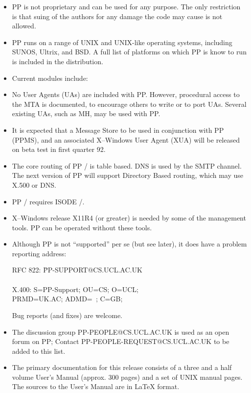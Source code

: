 
\begin{itemize}
\item PP is not proprietary and can be used for any purpose. The only
restriction is that suing of the authors for any damage
the code may cause is not allowed.

\item PP runs on a range of UNIX and UNIX-like operating systems, including
 SUNOS, Ultrix, and BSD.  A full list of platforms on which PP is know
 to run is included in the distribution.

\item Current modules include:



\item No User Agents (UAs) are included with PP.  However, procedural access
to the MTA is documented, to encourage others to write or to port UAs.
Several existing UAs, such as MH, may be used with PP. 


\item It is expected that a Message Store to be used in conjunction
  with PP (PPMS), and an associated X--Windows User Agent (XUA) will
  be released on beta test in first quarter 92.

\item The core routing of PP \ppversion/ is table based.   DNS is used
  by the SMTP channel.   The next version of PP will support Directory
  Based routing, which may use X.500 or DNS.   

\item PP \ppversion/ requires ISODE \isodevrsn/.

\item X--Windows release X11R4 (or greater) is needed by some of the
management tools.  PP  can be operated without these tools.

\item Although PP is not ``supported'' per se (but see later), it does
have a problem reporting address:  

\begin{tabbing}

RFC 822: \= PP-SUPPORT@CS.UCL.AC.UK \\ \\

X.400: \> S=PP-Support; OU=CS; O=UCL; \\
       \> PRMD=UK.AC; ADMD=\verb*| |; C=GB; \\

\end{tabbing}




Bug reports (and fixes) are welcome.

\item The discussion group PP-PEOPLE@CS.UCL.AC.UK is used as an open forum
on PP; Contact PP-PEOPLE-REQUEST@CS.UCL.AC.UK to be added to this
list.

\item The primary documentation for this release consists of a three and
a half volume User's Manual (approx. 300 pages) and a set of UNIX
manual pages.  The sources to the User's Manual are in LaTeX
format.
\end{itemize}

